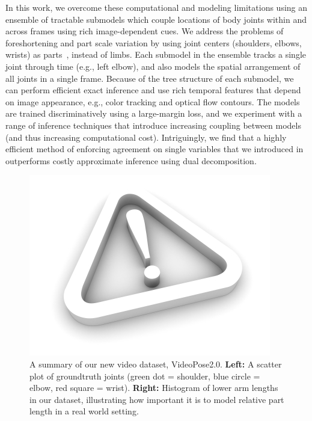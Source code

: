 In this work, we overcome these computational and modeling limitations
using an ensemble of tractable submodels which couple
locations of body joints within and across frames using rich
image-dependent cues.  We address the problems of foreshortening and
part scale variation by using joint centers (shoulders, elbows,
wrists) as parts~\cite{lee06,urtasun08,rogez08}, instead of
limbs. Each submodel in the ensemble tracks a
single joint through time (e.g., left elbow), and also models the
spatial arrangement of all joints in a single frame.  Because of the
tree structure of each submodel, we can perform efficient exact
inference and use rich temporal features that depend on image
appearance, e.g., color tracking and optical flow contours. The models
are trained discriminatively using a large-margin loss, and we
experiment with a range of inference techniques that introduce
increasing coupling between models (and thus increasing computational
cost). Intriguingly, we find that a highly efficient method of
enforcing agreement on single variables that we introduced in
\cite{weisssapp10} outperforms costly approximate inference using dual
decomposition.

\begin{figure}[tb!]
\centering
\includegraphics[width=0.9\linewidth]{figs/empty.jpg}
\caption{\small \label{fig:dataset} A summary of our new video dataset, VideoPose2.0. 
\textbf{Left:} A scatter plot of groundtruth joints (green dot = shoulder, blue 
circle = elbow, red square = wrist). \textbf{Right:} Histogram of lower arm 
lengths in our dataset, illustrating how important it is to model relative part 
length in a real world setting.  }
\end{figure}

